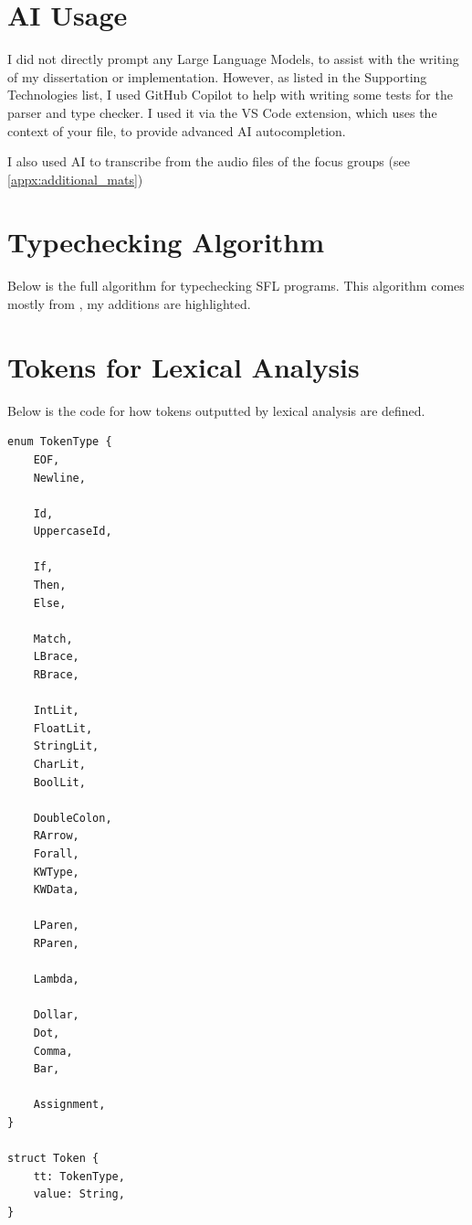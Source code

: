 
\appendix

\chapter{AI Usage}
\label{appx:ai_prompt}

I did not directly prompt any Large Language Models, to assist with the writing of my dissertation or implementation. However, as listed in the Supporting Technologies list, I used GitHub Copilot to help with writing some tests for the parser and type checker. I used it via the VS Code extension, which uses the context of your file, to provide advanced AI autocompletion.

I also used AI to transcribe from the audio files of the focus groups (see \ref{appx:additional_mats})







\chapter{Typechecking Algorithm}
Below is the full algorithm for typechecking SFL programs. This algorithm comes mostly from \cite{completebidir}, my additions are highlighted. 










\chapter{Tokens for Lexical Analysis}
\label{appx:tokens}
Below is the code for how tokens outputted by lexical analysis are defined. 
\begin{lstlisting}
enum TokenType {
    EOF,
    Newline,

    Id,
    UppercaseId,

    If,
    Then,
    Else,

    Match,
    LBrace,
    RBrace,

    IntLit,
    FloatLit,
    StringLit,
    CharLit,
    BoolLit,

    DoubleColon,
    RArrow,
    Forall,
    KWType,
    KWData,

    LParen,
    RParen,

    Lambda,

    Dollar,
    Dot,
    Comma,
    Bar,

    Assignment,
}

struct Token {
    tt: TokenType,
    value: String,
}
\end{lstlisting}

